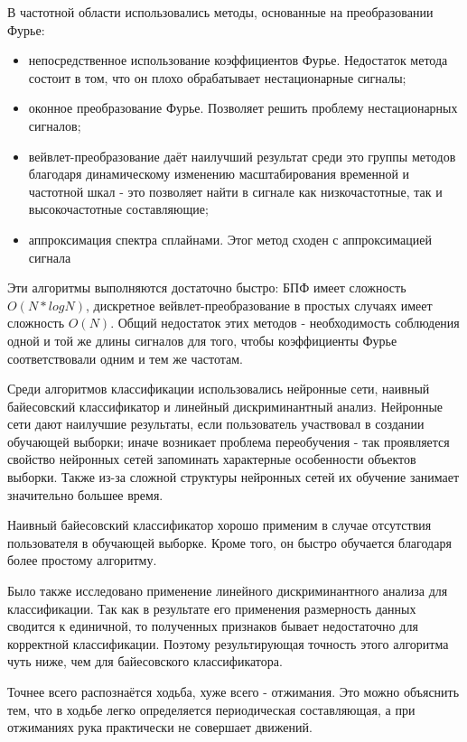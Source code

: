 В частотной области использовались методы, основанные на преобразовании Фурье:
\begin{itemize}
\item непосредственное использование коэффициентов Фурье. Недостаток метода состоит в том, что он плохо обрабатывает нестационарные сигналы;
\item оконное преобразование Фурье. Позволяет решить проблему нестационарных сигналов;
\item вейвлет-преобразование даёт наилучший результат среди это группы методов благодаря динамическому изменению масштабирования временной и частотной шкал - это позволяет найти в сигнале как низкочастотные, так и высокочастотные составляющие;
\item аппроксимация спектра сплайнами. Этог метод сходен с аппроксимацией сигнала
\end{itemize}

Эти алгоритмы выполняются достаточно быстро: БПФ имеет сложность $O(N*logN)$, дискретное вейвлет-преобразование в простых случаях имеет сложность $O(N)$. Общий недостаток этих методов - необходимость соблюдения одной и той же длины сигналов для того, чтобы коэффициенты Фурье соответствовали одним и тем же частотам.

Среди алгоритмов классификации использовались нейронные сети, наивный байесовский классификатор и линейный дискриминантный анализ. Нейронные сети дают наилучшие результаты, если пользователь участвовал в создании обучающей выборки; иначе возникает проблема переобучения - так проявляется свойство нейронных сетей запоминать характерные особенности объектов выборки. Также из-за сложной структуры нейронных сетей их обучение занимает значительно большее время. 

Наивный байесовский классификатор хорошо применим в случае отсутствия пользователя в обучающей выборке. Кроме того, он быстро обучается благодаря более простому алгоритму.

Было также исследовано применение линейного дискриминантного анализа для классификации. Так как в результате его применения размерность данных сводится к единичной, то полученных признаков бывает недостаточно для корректной классификации. Поэтому результирующая точность этого алгоритма чуть ниже, чем для байесовского классификатора.

Точнее всего распознаётся ходьба, хуже всего - отжимания. Это можно объяснить тем, что в ходьбе легко определяется периодическая составляющая, а при отжиманиях рука практически не совершает движений.

